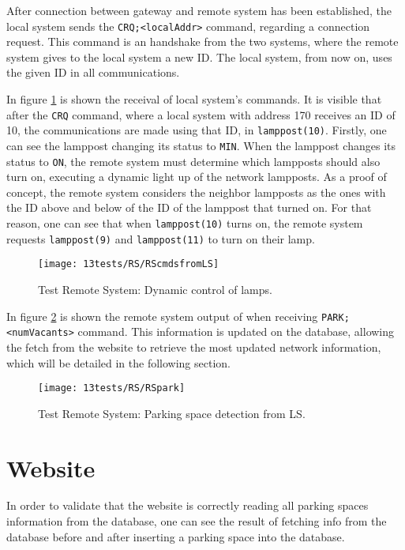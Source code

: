 After connection between gateway and remote system has been established, the local system sends the \verb|CRQ;<localAddr>| command, regarding a connection request. This command is an handshake from the two systems, where the remote system gives to the local system a new ID. The local system, from now on, uses the given ID in all communications.

In figure \ref{fig:RScmdsfromLS} is shown the receival of local system's commands. It is visible that after the \verb|CRQ| command, where a local system with address 170 receives an ID of 10, the communications are made using that ID, in \verb|lamppost(10)|. Firstly, one can see the lamppost changing its status to \verb|MIN|. When the lamppost changes its status to \verb|ON|, the remote system must determine which lampposts should also turn on, executing a dynamic light up of the network lampposts. As a proof of concept, the remote system considers the neighbor lampposts as the ones with the ID above and below of the ID of the lamppost that turned on. For that reason, one can see that when \verb|lamppost(10)| turns on, the remote system requests \verb|lamppost(9)| and \verb|lamppost(11)| to turn on their lamp.

\begin{figure}[H]
	\centering	
	\texttt{[image: 13tests/RS/RScmdsfromLS]}
	\caption{Test Remote System: Dynamic control of lamps.}
	\label{fig:RScmdsfromLS}
\end{figure}

In figure \ref{fig:RSpark} is shown the remote system output of when receiving \linebreak \verb|PARK;<numVacants>| command. This information is updated on the database, allowing the fetch from the website to retrieve the most updated network information, which will be detailed in the following section.

\begin{figure}[H]
	\centering	
	\texttt{[image: 13tests/RS/RSpark]}
	\caption{Test Remote System: Parking space detection from LS.}
	\label{fig:RSpark}
\end{figure}

\section{Website}
In order to validate that the website is correctly reading all parking spaces information from the database, one can see the result of fetching info from the database before and after inserting a parking space into the database.

